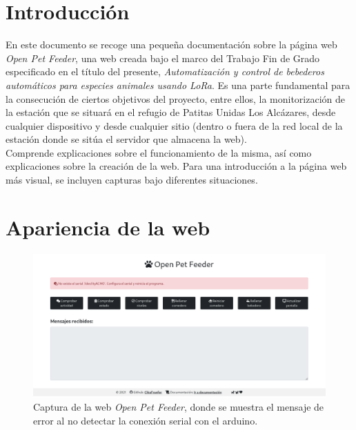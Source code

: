 \documentclass[12pt]{article}
\begin{document}
	\listoftables
	
	\pagebreak
	
	\section{Introducción}
	
	\noindent En este documento se recoge una pequeña documentación sobre la página web \textit{Open Pet Feeder}, una web creada bajo el marco del Trabajo Fin de Grado especificado en el título del presente, \textit{Automatización y control de bebederos automáticos para especies animales usando LoRa}. Es una parte fundamental para la consecución de ciertos objetivos del proyecto, entre ellos, la monitorización de la estación que se situará en el refugio de Patitas Unidas Los Alcázares, desde cualquier dispositivo y desde cualquier sitio (dentro o fuera de la red local de la estación donde se sitúa el servidor que almacena la web).\\
	
	\noindent Comprende explicaciones sobre el funcionamiento de la misma, así como explicaciones sobre la creación de la web. Para una introducción a la página web más visual, se incluyen capturas bajo diferentes situaciones.\\
	
	\section{Apariencia de la web}
	
	\begin{figure}[h!]
		\begin{center}
			\includegraphics[width=1\textwidth]{img_comp/captura_web_1.png}
			\caption{Captura de la web \textit{Open Pet Feeder}, donde se muestra el mensaje de error al no detectar la conexión serial con el arduino.}
			\label{captura web 1}
		\end{center}
	\end{figure}
\end{document}
